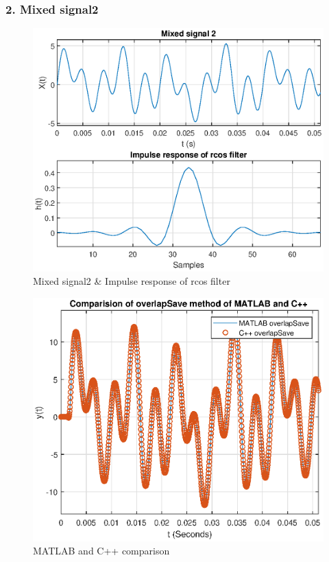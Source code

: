 \subsubsection{2. Mixed signal2}
\begin{figure}[h]
	\centering
	\includegraphics[width=12cm]{./algorithms/overlap_save/figures/mixed_signal2.eps}
	\caption{Mixed signal2 \& Impulse response of rcos filter}\label{mixed_signal2}
\end{figure}

\begin{figure}[h]
	\centering
	\includegraphics[width=12.5cm]{./algorithms/overlap_save/figures/mixed_signal2_matlab_and_C++.eps}
	\caption{MATLAB and C++ comparison}\label{mixed_signal2_matlab_and_C++}
\end{figure}

